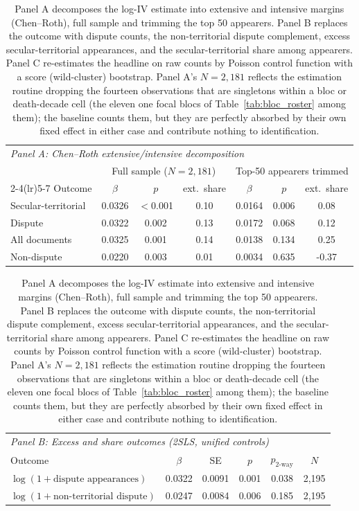 \documentclass[12pt]{article}
\theoremstyle{definition}
\theoremstyle{remark}
\begin{document}
\begin{table}[t]
\centering
\caption{Panel A decomposes the log-IV estimate into extensive and intensive margins (Chen--Roth), full sample and trimming the top 50 appearers. Panel B replaces the outcome with dispute counts, the non-territorial dispute complement, excess secular-territorial appearances, and the secular-territorial share among appearers. Panel C re-estimates the headline on raw counts by Poisson control function with a score (wild-cluster) bootstrap. Panel A's $N=2{,}181$ reflects the estimation routine dropping the fourteen observations that are singletons within a bloc or death-decade cell (the eleven one focal blocs of Table~\ref{tab:bloc_roster} among them); the baseline counts them, but they are perfectly absorbed by their own fixed effect in either case and contribute nothing to identification.}
\label{tab:app_margins}
{\small
\begin{tabular}{lcccccc}
\toprule
\multicolumn{7}{l}{\textit{Panel A: Chen--Roth extensive/intensive decomposition}} \\
\addlinespace
 & \multicolumn{3}{c}{Full sample ($N=2{,}181$)} & \multicolumn{3}{c}{Top-50 appearers trimmed} \\
\cmidrule(lr){2-4}\cmidrule(lr){5-7}
Outcome & $\beta$ & $p$ & ext.\ share & $\beta$ & $p$ & ext.\ share \\
\midrule
Secular-territorial & 0.0326 & $<$0.001 & 0.10 & 0.0164 & 0.006 & 0.08 \\
Dispute & 0.0322 & 0.002 & 0.13 & 0.0172 & 0.068 & 0.12 \\
All documents & 0.0325 & 0.001 & 0.14 & 0.0138 & 0.134 & 0.25 \\
Non-dispute & 0.0220 & 0.003 & 0.01 & 0.0034 & 0.635 & -0.37 \\
\bottomrule
\end{tabular}
\par\vspace{1.5ex}
\begin{tabular}{lccccc}
\toprule
\multicolumn{6}{l}{\textit{Panel B: Excess and share outcomes (2SLS, unified controls)}} \\
\addlinespace
Outcome & $\beta$ & SE & $p$ & $p_{\text{2-way}}$ & $N$ \\
\midrule
$\log(1+\text{dispute appearances})$ & 0.0322 & 0.0091 & 0.001 & 0.038 & 2,195 \\
$\log(1+\text{non-territorial dispute})$ & 0.0247 & 0.0084 & 0.006 & 0.185 & 2,195 \\

\end{tabular}}
\end{table}
\end{document}
